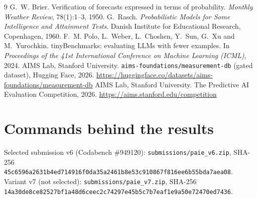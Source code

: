 \documentclass{article}
\begin{document}
\begin{thebibliography}{9}
 G.~W. Brier. Verification of forecasts expressed in terms of probability. \emph{Monthly Weather Review},
78(1):1--3, 1950.
 G.~Rasch. \emph{Probabilistic Models for Some Intelligence and Attainment Tests}. Danish Institute for
Educational Research, Copenhagen, 1960.
 F.~M. Polo, L.~Weber, L.~Choshen, Y.~Sun, G.~Xu and M.~Yurochkin. tinyBenchmarks: evaluating LLMs with
fewer examples. In \emph{Proceedings of the 41st International Conference on Machine Learning (ICML)}, 2024.
 AIMS Lab, Stanford University. \texttt{aims-foundations/measurement-db} (gated dataset), Hugging Face, 2026.
\url{https://huggingface.co/datasets/aims-foundations/measurement-db}
 AIMS Lab, Stanford University. The Predictive AI Evaluation Competition, 2026.
\url{https://aims.stanford.edu/competition}
\end{thebibliography}

\appendix

\section{Commands behind the results}
\label{app:repro}

Selected submission v6 (Codabench \#949120): \texttt{submissions/paie\_v6.zip}, SHA-256\\
\texttt{45c6596a2631b4ed714916f0da35a2461b8e53c910867f816ee6b55bda7aea08}.\\
Variant v7 (not selected): \texttt{submissions/paie\_v7.zip}, SHA-256\\
\texttt{14a30de8ce82527bf1a48d6ceec2c74297e45b5c7b7eaf1e9a50e72470ed7436}.
\end{document}
